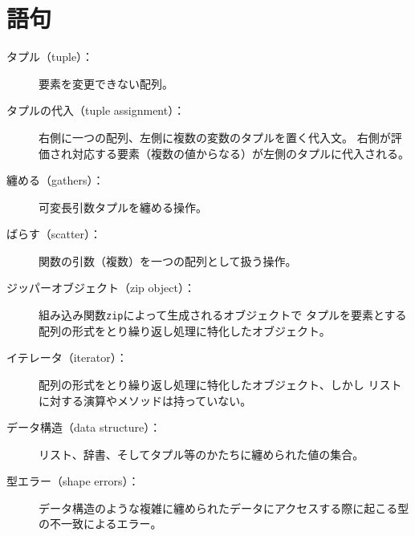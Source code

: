\documentclass[a4j,12pt,makeidx]{jbook}
\begin{document}
\section{語句}
\begin{description}

\item[タプル（tuple）：] 要素を変更できない配列。

\item[タプルの代入（tuple assignment）：] 右側に一つの配列、左側に複数の変数のタプルを置く代入文。
右側が評価され対応する要素（複数の値からなる）が左側のタプルに代入される。

\item[纏める（gathers）：] 可変長引数タプルを纏める操作。

\item[ばらす（scatter）：] 関数の引数（複数）を一つの配列として扱う操作。

\item[ジッパーオブジェクト（zip object）：] 組み込み関数{\tt zip}によって生成されるオブジェクトで
タプルを要素とする配列の形式をとり繰り返し処理に特化したオブジェクト。

\item[イテレータ（iterator）：] 配列の形式をとり繰り返し処理に特化したオブジェクト、しかし
リストに対する演算やメソッドは持っていない。

\item[データ構造（data structure）：] リスト、辞書、そしてタプル等のかたちに纏められた値の集合。

\item[型エラー（shape errors）：] データ構造のような複雑に纏められたデータにアクセスする際に起こる型の不一致によるエラー。

\end{description}
%
\end{document}
